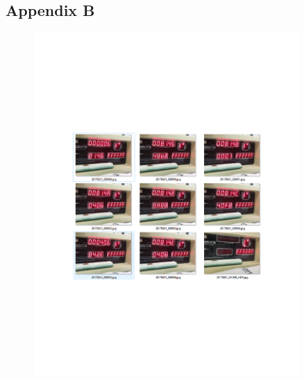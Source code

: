 \documentclass{article}
\begin{document}
\subsection{Appendix B}
					\begin{figure}[!htb]
					\begin{center}
					\includegraphics[width=0.9\textwidth]{b5}
					\end{center}\end{figure}
\end{document}
